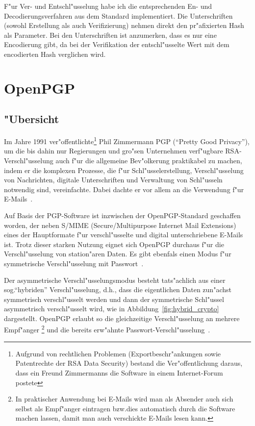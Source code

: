 \documentclass[12pt]{article}
\begin{document}
F"ur Ver- und Entschl"usselung habe ich die entsprechenden En- und De\-codie\-rungs\-ver\-fah\-ren
aus dem Standard implementiert.
Die Unterschriften (sowohl Erstellung als auch Verifizierung) nehmen direkt den
pr"afixierten Hash als Parameter.
Bei den Unterschriften ist anzumerken, dass es nur eine Encodierung gibt,
da bei der Verifikation der entschl"usselte Wert mit dem encodierten Hash verglichen wird.

\section{OpenPGP}
\subsection{"Ubersicht}

Im Jahre 1991 ver"offentlichte\footnote{Aufgrund von rechtlichen Problemen
(Exportbeschr"ankungen sowie Patentrechte der RSA Data Security) bestand die Ver"offentlichung daraus,
dass ein Freund Zimmermanns die Software in einem Internet-Forum postete}
Phil Zimmermann PGP ("`Pretty Good Privacy"'),
um die bis dahin nur Regierungen und gro"sen Unternehmen verf"ugbare RSA-Ver\-schl"us\-se\-lung
auch f"ur die allgemeine Bev"olkerung praktikabel zu machen,
indem er die komplexen Prozesse, die f"ur Schl"usselerstellung,
Verschl"usselung von Nachrichten, digitale Unterschriften und Verwaltung von Schl"usseln
notwendig sind, vereinfachte.
Dabei dachte er vor allem an die Verwendung f"ur E-Mails~\cite{singh}.

Auf Basis der PGP-Software ist inzwischen der OpenPGP-Standard geschaffen worden,
der neben S/MIME (Secure/Multipurpose Internet Mail Extensions)
eines der Hauptformate f"ur verschl"usselte und digital unterschriebene E-Mails ist.
Trotz dieser starken Nutzung eignet sich OpenPGP durchaus f"ur die Verschl"usselung
von station"aren Daten.
Es gibt ebenfals einen Modus f"ur symmetrische Verschl"usselung mit Passwort~\cite{rfc4480}.

Der asymmetrische Verschl"usselungsmodus besteht tats"achlich aus einer sog.\@ "`hybriden"'
Verschl"usselung, d.h.\@, dass die eigentlichen Daten zun"achst symmetrisch ver\-schl"us\-selt werden
und dann der symmetrische Schl"ussel asymmetrisch ver\-schl"us\-selt wird,
wie in Abbildung~\ref{fig:hybrid_crypto} dargestellt.
OpenPGP erlaubt so die gleichzeitige Verschl"usselung an mehrere Empf"anger%
\footnote{In praktischer Anwendung bei E-Mails wird man als Absender auch sich selbst
als Empf"anger eintragen bzw.\@ dies automatisch durch die Software machen lassen,
damit man auch verschickte E-Mails lesen kann.}
und die bereits erw"ahnte Passwort-Ver\-schl"us\-se\-lung~\cite{rfc4480}.
\end{document}
